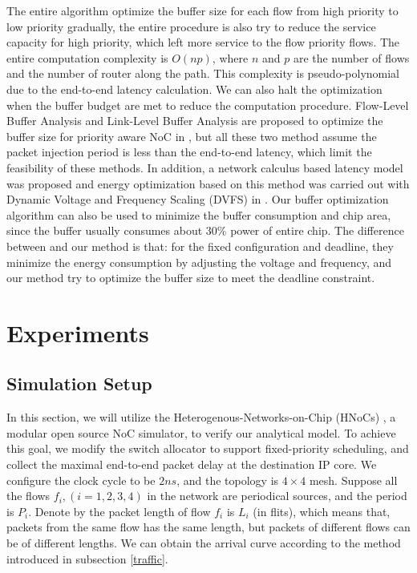 \documentclass[10pt,journal]{IEEEtran}
\begin{document}
The entire algorithm optimize the buffer size for each flow from high priority to low priority gradually, the entire procedure is also try to reduce the service capacity for high priority, which left more service to the flow priority flows. The entire computation complexity is $O(np)$, where $n$ and $p$ are the number of flows and the number of router along the path. This complexity is pseudo-polynomial due to the end-to-end latency calculation. We can also halt the optimization when the buffer budget are met to reduce the computation procedure. Flow-Level Buffer Analysis and Link-Level Buffer Analysis are proposed to optimize the buffer size for priority aware NoC in \cite{189}, but all these two method assume the packet injection period is less than the end-to-end latency, which limit the feasibility of these methods. In addition, a network calculus based latency model was proposed and energy optimization based on this method was carried out with Dynamic Voltage and Frequency Scaling (DVFS) in \cite{6560630}. Our buffer optimization algorithm can also be used to minimize the buffer consumption and chip area, since the buffer usually consumes about 30\% power of entire chip.  The difference between \cite{6560630} and our method is that: for the fixed configuration and deadline, they minimize the energy consumption by adjusting the voltage and frequency, and our method try to optimize the buffer size to meet the deadline constraint.


\section{Experiments}\label{experiments}
\subsection{Simulation Setup}
In this section, we will utilize the Heterogenous-Networks-on-Chip (HNoCs) \cite{6404157}, a modular open source NoC simulator, to verify our analytical model. To achieve this goal, we modify the switch allocator to support fixed-priority scheduling, and collect the maximal end-to-end packet delay at the destination IP core. We configure the clock cycle to be $2ns$, and the topology is $4\times 4$ mesh. Suppose all the flows $f_i,(i=1,2,3,4)$ in the network are periodical sources, and the period is $P_i$. Denote by the packet length of flow $f_i$ is $L_i$ (in flits), which means that, packets from the same flow has the same length, but packets of different flows can be of different lengths. We can obtain the arrival curve according to the method introduced in subsection \ref{traffic}.
\end{document}
